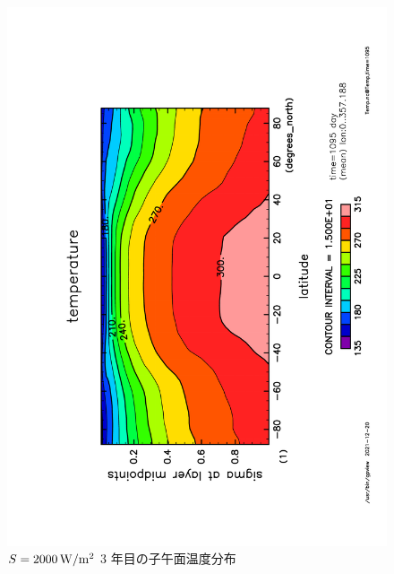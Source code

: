 \documentclass[body]{subfiles}
\begin{document}
\begin{figure}[t]
	\includegraphics[height=\textwidth,angle=-90]{S2000Temp,time=1095.pdf}
	\caption{\(S=2000\hmu{W/m^2}\) 3 年目の子午面温度分布
	}
\end{figure}
\end{document}
